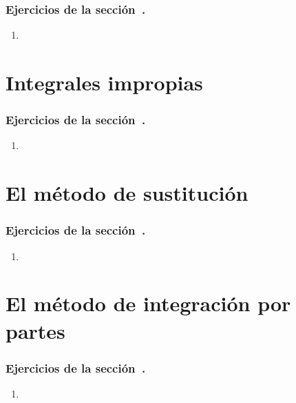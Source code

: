 \subsubsection*{Ejercicios de la sección~.}

\begin{enumerate}
\item 
\end{enumerate}


\section{Integrales impropias}


\subsubsection*{Ejercicios de la sección~.}

\begin{enumerate}
\item 
\end{enumerate}


\section{El método de sustitución}


\subsubsection*{Ejercicios de la sección~.}

\begin{enumerate}
\item 
\end{enumerate}


\section{El método de integración por partes}


\subsubsection*{Ejercicios de la sección~.}

\begin{enumerate}
\item 
\end{enumerate}


